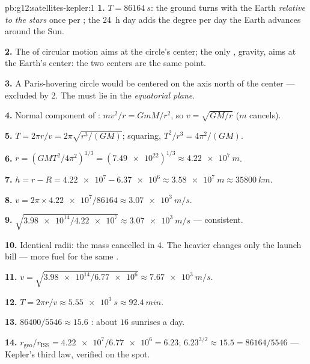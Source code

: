 \begin{solution}{pb:g12:satellites-kepler:1}
\textbf{1.} $T = \qty{86164}{s}$: the ground turns with the Earth
\emph{relative to the stars} once per ; the \qty{24}{h}
day adds the degree per day the Earth advances around the Sun.

\textbf{2.} The  of circular motion aims at the circle's
center; the only , gravity, aims at the Earth's center: the two
centers are the same point.

\textbf{3.} A Paris-hovering circle would be centered on the axis
north of the center --- excluded by 2. The  must lie in the
\emph{equatorial plane}.

\textbf{4.} Normal component of :
$m v^2/r = GmM/r^2$, so $v = \sqrt{GM/r}$ ($m$ cancels).

\textbf{5.} $T = 2\pi r/v = 2\pi\sqrt{r^3/(GM)}$; squaring,
$T^2/r^3 = 4\pi^2/(GM)$.

\textbf{6.} $r = \left(GMT^2/4\pi^2\right)^{1/3} =
(\num{7.49e22})^{1/3} \approx \qty{4.22e7}{m}$.

\textbf{7.} $h = r - R = \num{4.22e7} - \num{6.37e6} \approx
\qty{3.58e7}{m} \approx \qty{35800}{km}$.

\textbf{8.} $v = 2\pi \times \num{4.22e7}/\num{86164} \approx
\qty{3.07e3}{m/s}$.

\textbf{9.} $\sqrt{\num{3.98e14}/\num{4.22e7}} \approx
\qty{3.07e3}{m/s}$ --- consistent.

\textbf{10.} Identical radii: the mass cancelled in 4. The heavier
 changes only the launch bill --- more fuel for the same
.

\textbf{11.} $v = \sqrt{\num{3.98e14}/\num{6.77e6}} \approx
\qty{7.67e3}{m/s}$.

\textbf{12.} $T = 2\pi r/v \approx \qty{5.55e3}{s} \approx
\qty{92.4}{min}$.

\textbf{13.} $\num{86400}/5546 \approx 15.6$ : about $16$
sunrises a day.

\textbf{14.} $r_{\text{geo}}/r_{\text{ISS}} = \num{4.22e7}/\num{6.77e6}
= 6.23$; $6.23^{3/2} \approx 15.5 = \num{86164}/5546$ --- Kepler's
third law, verified on the spot.


\end{solution}
